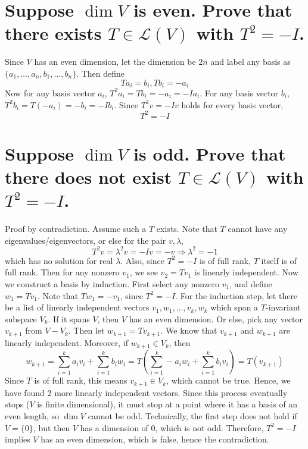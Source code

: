 \documentclass[answers]{exam}
\begin{document}
\begin{questions}
\begin{parts}
\end{parts}


\begin{parts}
    \part{Suppose $\dim V$ is even. Prove that there exists $T \in \mathcal L(V)$ with $T^2=-I$.}

    \begin{solution}
        Since $V$ has an even dimension, let the dimension be $2n$ and label any basis as $\{a_1,\dots,a_n,b_1,\dots,b_n\}$. Then define
        $$Ta_i = b_i, Tb_i = -a_i$$
        Now for any basis vector $a_i$, $T^2a_i = Tb_i = -a_i = -Ia_i$. For any basis vector $b_i$, $T^2b_i = T(-a_i) = -b_i = -Ib_i$. Since $T^2v = -Iv$ holds for every basis vector,
        $$T^2 = -I$$
    \end{solution}

    \part{Suppose $\dim V$ is odd. Prove that there does not exist $T \in \mathcal L(V)$ with $T^2 = -I$.}

    \begin{solution}
        Proof by contradiction. Assume such a $T$ exists. Note that $T$ cannot have any eigenvalues/eigenvectors, or else for the pair $v,\lambda$,
        $$T^2v = \lambda^2v = -Iv = -v \Rightarrow \lambda^2 = -1$$
        which has no solution for real $\lambda$. Also, since $T^2=-I$ is of full rank, $T$ itself is of full rank. Then for any nonzero $v_1$, we see $v_2 = Tv_1$ is linearly independent. Now we construct a basis by induction. First select any nonzero $v_1$, and define $w_1 = Tv_1$. Note that $Tw_1 = -v_1$, since $T^2=-I$. For the induction step, let there be a list of linearly independent vectors $v_1,w_1,\dots,v_k,w_k$ which span a $T$-invariant subspace $V_k$. If it spans $V$, then $V$ has an even dimension. Or else, pick any vector $v_{k+1}$ from $V - V_k$. Then let $w_{k+1} = Tv_{k+1}$. We know that $v_{k+1}$ and $w_{k+1}$ are linearly independent. Moreover, if $w_{k+1} \in V_k$, then
        $$w_{k+1} = \sum_{i=1}^k a_iv_i + \sum_{i=1}^k b_iw_i = T\left(\sum_{i=1}^k -a_iw_i + \sum_{i=1}^k b_iv_i\right) = T(v_{k+1})$$
        Since $T$ is of full rank, this means $v_{k+1} \in V_k$, which cannot be true. Hence, we have found 2 more linearly independent vectors. Since this process eventually stops ($V$ is finite dimensional), it must stop at a point where it has a basis of an even length, so $\dim V$ cannot be odd. Technically, the first step does not hold if $V = \{0\}$, but then $V$ has a dimension of 0, which is not odd. Therefore, $T^2 = -I$ implies $V$ has an even dimension, which is false, hence the contradiction.
    \end{solution}


\end{parts}
\end{questions}
\end{document}
